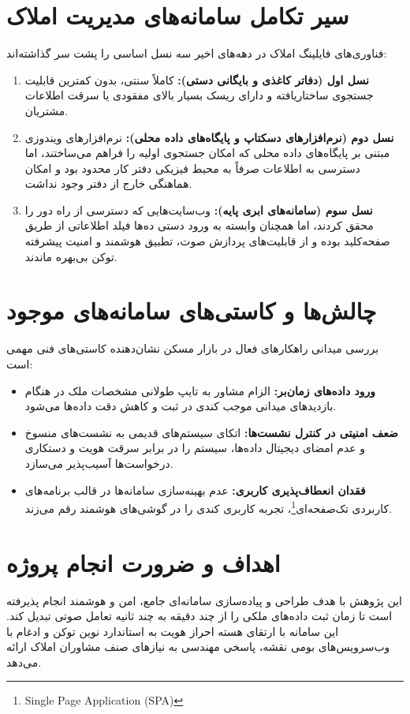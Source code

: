 \documentclass[11pt, a4paper]{report}
\newcommand{\enfootnote}[1]{\footnote{\foreignlanguage{english}{#1}}}
\begin{document}
\section{سیر تکامل سامانه‌های مدیریت املاک}
فناوری‌های فایلینگ املاک در دهه‌های اخیر سه نسل اساسی را پشت سر گذاشته‌اند:
\begin{enumerate}
    \item \textbf{نسل اول (دفاتر کاغذی و بایگانی دستی):} کاملاً سنتی، بدون کمترین قابلیت جستجوی ساختاریافته و دارای ریسک بسیار بالای مفقودی یا سرقت اطلاعات مشتریان.
    \item \textbf{نسل دوم (نرم‌افزارهای دسکتاپ و پایگاه‌های داده محلی):} نرم‌افزارهای ویندوزی مبتنی بر پایگاه‌های داده محلی که امکان جستجوی اولیه را فراهم می‌ساختند، اما دسترسی به اطلاعات صرفاً به محیط فیزیکی دفتر کار محدود بود و امکان هماهنگی خارج از دفتر وجود نداشت.
    \item \textbf{نسل سوم (سامانه‌های ابری پایه):} وب‌سایت‌هایی که دسترسی از راه دور را محقق کردند، اما همچنان وابسته به ورود دستی ده‌ها فیلد اطلاعاتی از طریق صفحه‌کلید بوده و از قابلیت‌های پردازش صوت، تطبیق هوشمند و امنیت پیشرفته توکن بی‌بهره ماندند.
\end{enumerate}

\section{چالش‌ها و کاستی‌های سامانه‌های موجود}
بررسی میدانی راهکارهای فعال در بازار مسکن نشان‌دهنده کاستی‌های فنی مهمی است:
\begin{itemize}
    \item \textbf{ورود داده‌های زمان‌بر:} الزام مشاور به تایپ طولانی مشخصات ملک در هنگام بازدیدهای میدانی موجب کندی در ثبت و کاهش دقت داده‌ها می‌شود.
    \item \textbf{ضعف امنیتی در کنترل نشست‌ها:} اتکای سیستم‌های قدیمی به نشست‌های منسوخ و عدم امضای دیجیتال داده‌ها، سیستم را در برابر سرقت هویت و دستکاری درخواست‌ها آسیب‌پذیر می‌سازد.
    \item \textbf{فقدان انعطاف‌پذیری کاربری:} عدم بهینه‌سازی سامانه‌ها در قالب برنامه‌های کاربردی تک‌صفحه‌ای\enfootnote{Single Page Application (SPA)}، تجربه کاربری کندی را در گوشی‌های هوشمند رقم می‌زند.
\end{itemize}

\section{اهداف و ضرورت انجام پروژه}
این پژوهش با هدف طراحی و پیاده‌سازی سامانه‌ای جامع، امن و هوشمند انجام پذیرفته است تا زمان ثبت داده‌های ملکی را از چند دقیقه به چند ثانیه تعامل صوتی تبدیل کند. این سامانه با ارتقای هسته احراز هویت به استاندارد نوین توکن و ادغام با وب‌سرویس‌های بومی نقشه، پاسخی مهندسی به نیازهای صنف مشاوران املاک ارائه می‌دهد.
\end{document}
